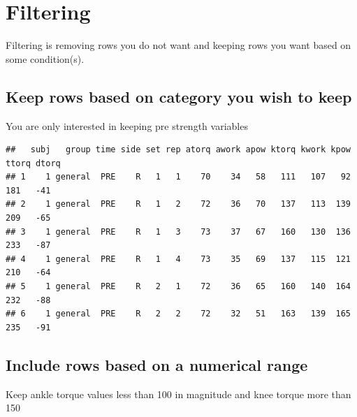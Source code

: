 \documentclass[
]{book}
\newenvironment{Shaded}{\begin{snugshade}}{\end{snugshade}}
\newcommand{\KeywordTok}[1]{\textcolor[rgb]{0.13,0.29,0.53}{\textbf{#1}}}
\newcommand{\NormalTok}[1]{#1}
\newcommand{\OperatorTok}[1]{\textcolor[rgb]{0.81,0.36,0.00}{\textbf{#1}}}
\newcommand{\StringTok}[1]{\textcolor[rgb]{0.31,0.60,0.02}{#1}}
\begin{document}
\hypertarget{filtering}{%
\section{Filtering}\label{filtering}}

Filtering is removing rows you do not want and keeping rows you want based on some condition(s).

\hypertarget{keep-rows-based-on-category-you-wish-to-keep}{%
\subsection{Keep rows based on category you wish to keep}\label{keep-rows-based-on-category-you-wish-to-keep}}

You are only interested in keeping pre strength variables

\begin{Shaded}
\end{Shaded}

\begin{verbatim}
##   subj   group time side set rep atorq awork apow ktorq kwork kpow ttorq dtorq
## 1    1 general  PRE    R   1   1    70    34   58   111   107   92   181   -41
## 2    1 general  PRE    R   1   2    72    36   70   137   113  139   209   -65
## 3    1 general  PRE    R   1   3    73    37   67   160   130  136   233   -87
## 4    1 general  PRE    R   1   4    73    35   69   137   115  121   210   -64
## 5    1 general  PRE    R   2   1    72    36   65   160   140  164   232   -88
## 6    1 general  PRE    R   2   2    72    32   51   163   139  165   235   -91
\end{verbatim}

\hypertarget{include-rows-based-on-a-numerical-range}{%
\subsection{Include rows based on a numerical range}\label{include-rows-based-on-a-numerical-range}}

Keep ankle torque values less than 100 in magnitude and knee torque more than 150
\end{document}
